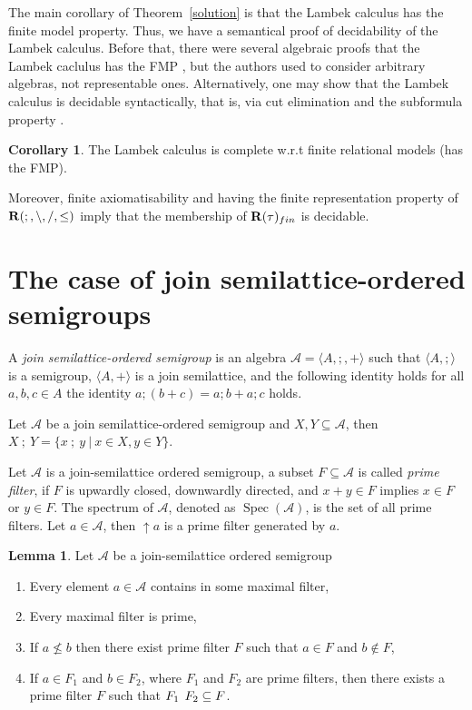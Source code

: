 \documentclass[a4paper]{article}
\theoremstyle{definition}
\theoremstyle{theorem}
\theoremstyle{proposition}
\theoremstyle{lemma}
\newtheorem{lemma}{Lemma}
\theoremstyle{ex}
\theoremstyle{corollary}
\newtheorem{corollary}{Corollary}
\theoremstyle{claim}
\begin{document}
The main corollary of Theorem~\ref{solution} is that the Lambek calculus has the finite model property. Thus, we have a semantical proof of decidability of the Lambek calculus. Before that, there were several algebraic proofs that the Lambek caclulus has the FMP \cite{buszkowski2008infinitary}, but the authors used to consider arbitrary algebras, not representable ones.
Alternatively, one may show that the Lambek calculus is decidable syntactically, that is, via cut elimination and the subformula property \cite{lambek1958mathematics}.

\begin{corollary} \label{fmp}
  The Lambek calculus is complete w.r.t finite relational models (has the FMP).
\end{corollary}

Moreover, finite axiomatisability and having the finite representation property of ${\bf R}(;, \setminus, /, \leq)$ imply that the membership of ${\bf R}(\tau)_{fin}$ is decidable.

\section{The case of join semilattice-ordered semigroups}

A \emph{join semilattice-ordered semigroup} is an algebra $\mathcal{A} = \langle A, ;, + \rangle$ such that $\langle A, ; \rangle$ is a semigroup, $\langle A, + \rangle$ is a join semilattice, and the following identity holds for all $a, b, c \in A$ the identity $a ; (b + c) = a ; b + a ; c$ holds.

Let $\mathcal{A}$ be a join semilattice-ordered semigroup and $X, Y \subseteq \mathcal{A}$, then $X \: ; \: Y = \{ x \: ; \: y \: | \: x \in X, y \in Y \}$.

Let $\mathcal{A}$ is a join-semilattice ordered semigroup, a subset $F \subseteq \mathcal{A}$ is called \emph{prime filter}, if $F$ is upwardly closed, downwardly directed, and $x + y \in F$ implies $x \in F$ or $y \in F$. The spectrum of $\mathcal{A}$, denoted as $\operatorname{Spec}(\mathcal{A})$, is the set of all prime filters. Let $a \in \mathcal{A}$, then $\uparrow a$ is a prime filter generated by $a$.

\begin{lemma}
Let $\mathcal{A}$ be a join-semilattice ordered semigroup

  \begin{enumerate}
    \item Every element $a \in \mathcal{A}$ contains in some maximal filter,
    \item Every maximal filter is prime,
    \item If $a \not\leq b$ then there exist prime filter $F$ such that $a \in F$ and $b \not\in F$,
    \item If $a \in F_1$ and $b \in F_2$, where $F_1$ and $F_2$ are prime filters, then there exists a prime filter $F$ such that $F_1 \: \* \: F_2 \subseteq F$.
  \end{enumerate}
\end{lemma}
\end{document}
